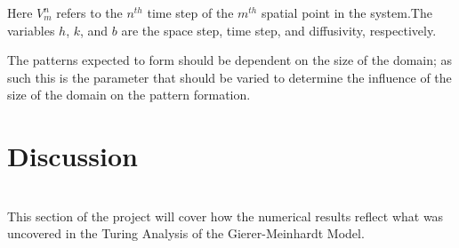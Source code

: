 \documentclass[12pt]{article}
\begin{document}
Here $V^n_m$ refers to the $n^{th}$ time step of the $m^{th}$ spatial point in the system.The variables $h$, $k$, and $b$ are the space step, time step, and diffusivity, respectively.\cite{Strikwerda2004}

The patterns expected to form should be dependent on the size of the domain; as such this is the parameter that should be varied to determine the influence of the size of the domain on the pattern formation.

 \section*{Discussion}\\
This section of the project will cover how the numerical results reflect what was uncovered in the Turing Analysis of the Gierer-Meinhardt Model.

\pagebreak

\nocite{*}


\end{document}
